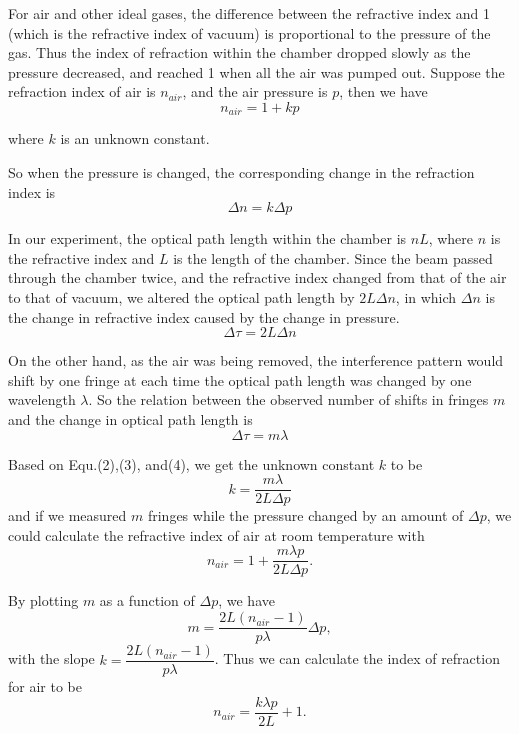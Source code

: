 \documentclass{article}
\begin{document}
For air and other ideal gases, the difference between the refractive index and 1 (which is the refractive index of vacuum) is proportional to the pressure of the gas. Thus the index of refraction within the chamber dropped slowly as the pressure decreased, and reached 1 when all the air was pumped out. Suppose the refraction index of air is $n_{air}$, and the air pressure is $p$, then we have
\begin{equation}
	n_{air}=1+kp
\end{equation}

where $k$ is an unknown constant. 

So when the pressure is changed, the corresponding change in the refraction index is
\begin{equation}
\Delta{n}=k\Delta{p}
\end{equation} 

In our experiment, the optical path length within the chamber is $nL$, where $n$ is the refractive index and $L$ is the length of the chamber. Since the beam passed through the chamber twice, and the refractive index changed from that of the air to that of vacuum, we altered the optical path length by $2L\Delta{n}$, in which $\Delta{n}$ is the change in refractive index caused by the change in pressure. 
\begin{equation}
	\Delta{\tau}=2L\Delta{n}
\end{equation}

On the other hand, as the air was being removed, the interference pattern would shift by one fringe at each time the optical path length was changed by one wavelength $\lambda$. So the relation between the observed number of shifts in fringes $m$ and the change in optical path length is 
\begin{equation}
	\Delta{\tau}=m\lambda
\end{equation}

Based on Equ.(2),(3), and(4), we get the unknown constant $k$ to be 
\begin{equation}
	k=\dfrac{m\lambda}{2L\Delta{p}}
\end{equation} 
and if we measured $m$ fringes while the pressure changed by an amount of $\Delta{p}$, we could calculate the refractive index of air at room temperature with
\begin{equation}
	n_{air}=1+\dfrac{m\lambda{p}}{2L\Delta{p}}.
\end{equation}

By plotting $m$ as a function of $\Delta{p}$, we have 
\begin{equation}
	m=\dfrac{2L(n_{air}-1)}{p\lambda}\Delta{p},
\end{equation}
with the slope $k=\dfrac{2L(n_{air}-1)}{p\lambda}$. Thus we can calculate the index of refraction for air to be 
\begin{equation}
	n_{air}=\dfrac{k\lambda{p}}{2L}+1.
\end{equation}
\end{document}
